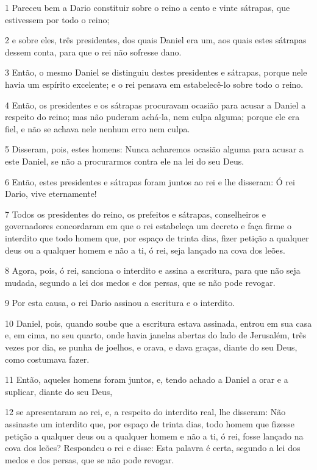 \par 1 Pareceu bem a Dario constituir sobre o reino a cento e vinte sátrapas, que estivessem por todo o reino;
\par 2 e sobre eles, três presidentes, dos quais Daniel era um, aos quais estes sátrapas dessem conta, para que o rei não sofresse dano.
\par 3 Então, o mesmo Daniel se distinguiu destes presidentes e sátrapas, porque nele havia um espírito excelente; e o rei pensava em estabelecê-lo sobre todo o reino.
\par 4 Então, os presidentes e os sátrapas procuravam ocasião para acusar a Daniel a respeito do reino; mas não puderam achá-la, nem culpa alguma; porque ele era fiel, e não se achava nele nenhum erro nem culpa.
\par 5 Disseram, pois, estes homens: Nunca acharemos ocasião alguma para acusar a este Daniel, se não a procurarmos contra ele na lei do seu Deus.
\par 6 Então, estes presidentes e sátrapas foram juntos ao rei e lhe disseram: Ó rei Dario, vive eternamente!
\par 7 Todos os presidentes do reino, os prefeitos e sátrapas, conselheiros e governadores concordaram em que o rei estabeleça um decreto e faça firme o interdito que todo homem que, por espaço de trinta dias, fizer petição a qualquer deus ou a qualquer homem e não a ti, ó rei, seja lançado na cova dos leões.
\par 8 Agora, pois, ó rei, sanciona o interdito e assina a escritura, para que não seja mudada, segundo a lei dos medos e dos persas, que se não pode revogar.
\par 9 Por esta causa, o rei Dario assinou a escritura e o interdito.
\par 10 Daniel, pois, quando soube que a escritura estava assinada, entrou em sua casa e, em cima, no seu quarto, onde havia janelas abertas do lado de Jerusalém, três vezes por dia, se punha de joelhos, e orava, e dava graças, diante do seu Deus, como costumava fazer.
\par 11 Então, aqueles homens foram juntos, e, tendo achado a Daniel a orar e a suplicar, diante do seu Deus,
\par 12 se apresentaram ao rei, e, a respeito do interdito real, lhe disseram: Não assinaste um interdito que, por espaço de trinta dias, todo homem que fizesse petição a qualquer deus ou a qualquer homem e não a ti, ó rei, fosse lançado na cova dos leões? Respondeu o rei e disse: Esta palavra é certa, segundo a lei dos medos e dos persas, que se não pode revogar.

